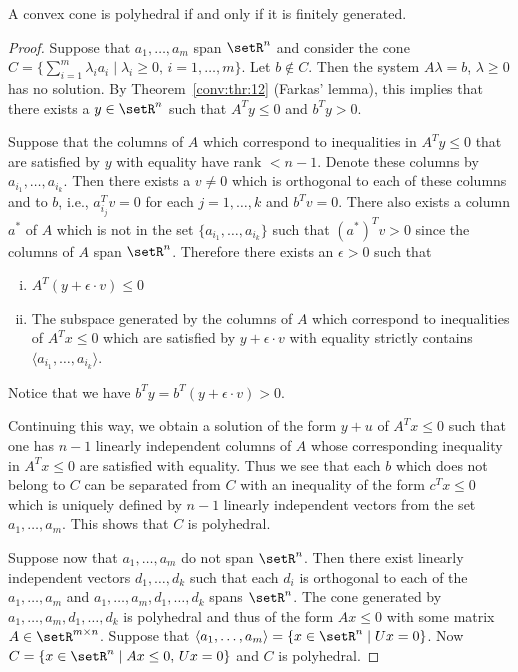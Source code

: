 \begin{theorem}
  \label{po:thr:3}
  A convex cone is polyhedral if and only if it is finitely
  generated. 
\end{theorem}


\begin{proof}
  Suppose that $a_1,\ldots,a_m$ span $\setR^n$ and consider the cone $C = \{
  \sum_{i=1}^m \lambda_i a_i \mid \lambda_i\geq0, \, i=1,\ldots,m\}$.
  Let $b \notin C$.
  Then the system $A\lambda = b$, $\lambda \geq 0$ has no solution.
  By Theorem~\ref{conv:thr:12} (Farkas' lemma), this implies that there exists a $y\in\setR^n$
  such that $A^Ty \leq 0$ and $b^Ty > 0$.

  Suppose that the columns of $A$ which correspond to
  inequalities in $A^Ty\leq0$   that are satisfied  by $y$ with equality
  have rank $<n-1$.
  Denote these columns by $a_{i_1},\ldots,a_{i_k}$.  
  Then there exists a $v\neq0$ which is orthogonal to
  each of these columns and to $b$, i.e., $a_{i_j}^Tv = 0$ for each
  $j=1,\ldots,k$ and $b^Tv =0 $. 
  There also exists a column $a^*$ of $A$ which is not in the set
  $\{a_{i_1},\ldots,a_{i_k}\}$ such that $(a^*)^Tv>0$ since the columns of
  $A$ span $\setR^n$. Therefore there exists an $\epsilon>0$ such that 
  \begin{enumerate}[i)]
  \item $A^T(y + \epsilon \cdot v)\leq0$ 
  \item The subspace generated by the columns of $A$ which correspond
    to inequalities of $A^Tx\leq0$ which are satisfied by $y + \epsilon \cdot v$
    with equality strictly contains $\langle a_{i_1},\ldots,a_{i_k}\rangle$. 
  \end{enumerate}
  
  Notice that we have $b^Ty = b^T(y + \epsilon \cdot v)>0$. 

  Continuing this way, we obtain a solution of the form $y + u$ of
  $A^Tx\leq0$ such that one has $n-1$ linearly independent columns of $A$
  whose corresponding inequality in $A^Tx\leq0$ are satisfied with
  equality.   Thus we see that each $b$ which does
  not belong to $C$ can be separated from $C$ with an inequality of
  the form $c^Tx\leq0$  which
  is uniquely defined by $n-1$ linearly independent vectors from the set
  $a_1,\ldots,a_m$.  This shows that $C$ is polyhedral. 

  Suppose now that $a_1,\ldots,a_m$ do not span $\setR^n$. Then there  exist
  linearly independent vectors $d_1,\ldots,d_k$ such that each $d_i$ is
  orthogonal to each of the $a_1,\ldots,a_m$ and $a_1,\ldots,a_m,d_1,\ldots,d_k$
  spans $\setR^n$.   The cone generated by
  $a_1,\ldots,a_m,d_1,\ldots,d_k$ is polyhedral and thus of the form $Ax\leq0$
  with some matrix $A\in \setR^{m\times n}$. Suppose that  $\langle a_1,\ldots,a_m\rangle = \{x
  \in \setR^n \mid Ux = 0\}$.  Now $C = \{ x \in \setR^n \mid Ax\leq0, \, Ux = 0\}$
  and $C$ is polyhedral. 



\end{proof}

